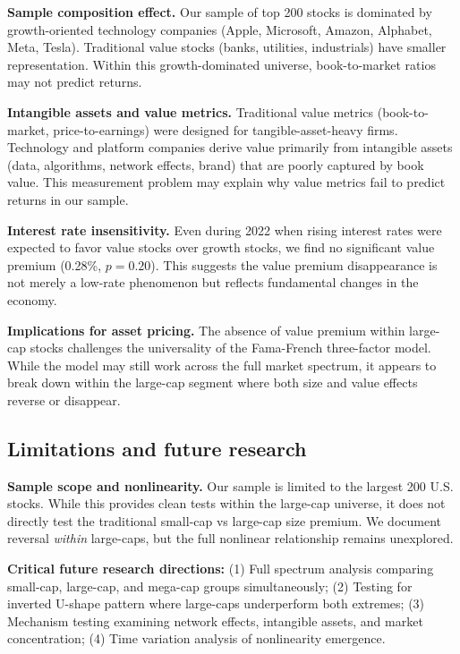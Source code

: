 \documentclass[10pt,letterpaper]{article}
\begin{document}
\textbf{Sample composition effect.} Our sample of top 200 stocks is dominated by growth-oriented technology companies (Apple, Microsoft, Amazon, Alphabet, Meta, Tesla). Traditional value stocks (banks, utilities, industrials) have smaller representation. Within this growth-dominated universe, book-to-market ratios may not predict returns.

\textbf{Intangible assets and value metrics.} Traditional value metrics (book-to-market, price-to-earnings) were designed for tangible-asset-heavy firms. Technology and platform companies derive value primarily from intangible assets (data, algorithms, network effects, brand) that are poorly captured by book value. This measurement problem may explain why value metrics fail to predict returns in our sample.

\textbf{Interest rate insensitivity.} Even during 2022 when rising interest rates were expected to favor value stocks over growth stocks, we find no significant value premium (0.28\%, $p=0.20$). This suggests the value premium disappearance is not merely a low-rate phenomenon but reflects fundamental changes in the economy.

\textbf{Implications for asset pricing.} The absence of value premium within large-cap stocks challenges the universality of the Fama-French three-factor model. While the model may still work across the full market spectrum, it appears to break down within the large-cap segment where both size and value effects reverse or disappear.

\subsection*{Limitations and future research}

\textbf{Sample scope and nonlinearity.} Our sample is limited to the largest 200 U.S. stocks. While this provides clean tests within the large-cap universe, it does not directly test the traditional small-cap vs large-cap size premium. We document reversal \textit{within} large-caps, but the full nonlinear relationship remains unexplored.

\textbf{Critical future research directions:} (1) Full spectrum analysis comparing small-cap, large-cap, and mega-cap groups simultaneously; (2) Testing for inverted U-shape pattern where large-caps underperform both extremes; (3) Mechanism testing examining network effects, intangible assets, and market concentration; (4) Time variation analysis of nonlinearity emergence.
\end{document}
